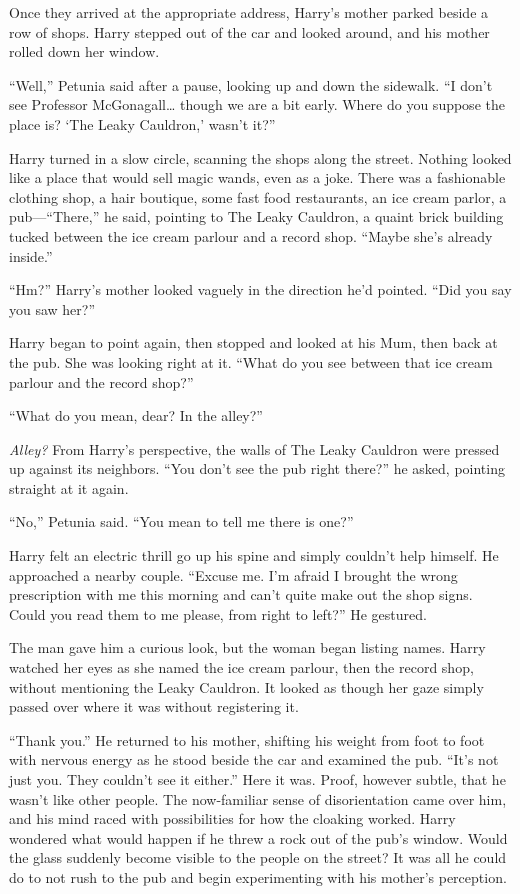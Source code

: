 Once they arrived at the appropriate address, Harry’s
mother parked beside a row of shops. Harry stepped out
of the car and looked around, and his mother rolled down
her window.

“Well,” Petunia said after a pause, looking up and down
the sidewalk. “I don’t see Professor McGonagall… though
we are a bit early. Where do you suppose the place is?
‘The Leaky Cauldron,’ wasn’t it?”

Harry turned in a slow circle, scanning the shops along the
street. Nothing looked like a place that would sell magic
wands, even as a joke. There was a fashionable clothing
shop, a hair boutique, some fast food
restaurants, an ice cream parlor, a pub—“There,” he said,
pointing to The Leaky Cauldron, a quaint brick building
tucked between the ice cream parlour and a record shop. “Maybe
she’s already inside.”

“Hm?” Harry’s mother looked vaguely in the direction he’d
pointed. “Did you say you saw her?”

Harry began to point again, then stopped and looked at
his Mum, then back at the pub. She was looking right at
it. “What do you see between that ice cream parlour and the
record shop?”

“What do you mean, dear? In the alley?”

\emph{Alley?} From Harry’s perspective, the walls of The Leaky
Cauldron were pressed up against its neighbors. “You don’t
see the pub right there?” he asked, pointing straight at it
again.

“No,” Petunia said. “You mean to tell me there is one?”

Harry felt an electric thrill go up his spine and simply
couldn’t help himself. He approached a nearby couple.
“Excuse me. I’m afraid I brought
the wrong prescription with me this morning and can’t
quite make out the shop signs. Could you read them to
me please, from right to left?” He gestured.

The man gave him a curious look, but the woman began
listing names. Harry watched her eyes as she named the
ice cream parlour, then the record shop, without mentioning the
Leaky Cauldron. It looked as though her gaze simply
passed over where it was without registering it.

“Thank you.” He returned to his mother, shifting his weight
from foot to foot with nervous energy as he stood beside
the car and examined the pub. “It’s not just you. They
couldn’t see it either.” Here it was. Proof, however subtle,
that he wasn’t like other people. The now-familiar sense of
disorientation came over him, and his mind raced with
possibilities for how the cloaking worked. Harry wondered
what would happen if he threw a rock out of the pub’s
window. Would the glass suddenly become visible to the
people on the street? It was all he could do to not rush
to the pub and begin experimenting with his mother’s
perception.

